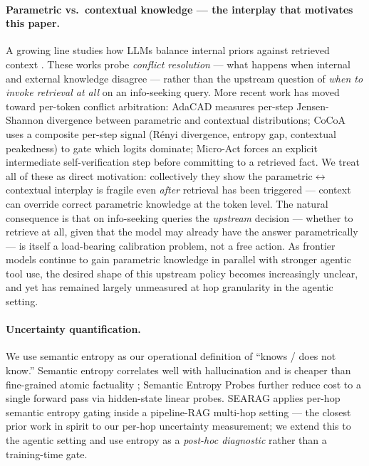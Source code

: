 \documentclass[10pt,letterpaper]{article}
\begin{document}
\paragraph{Parametric vs.\ contextual knowledge --- the interplay that motivates this paper.}
A growing line studies how LLMs balance internal priors against retrieved context
\citep{cheng2024interplay,wu2024clasheval,farahani2024deciphering,kim2025reliability,wadhwa2026rags,tao2024context,zhang2024fusion}.
These works probe \emph{conflict resolution} --- what happens when internal and external
knowledge disagree --- rather than the upstream question of \emph{when to invoke
retrieval at all} on an info-seeking query. More recent work has moved toward per-token
conflict arbitration: AdaCAD \citep{adacad2025} measures per-step Jensen-Shannon
divergence between parametric and contextual distributions; CoCoA \citep{cocoa2025} uses
a composite per-step signal (R\'{e}nyi divergence, entropy gap, contextual peakedness)
to gate which logits dominate; Micro-Act \citep{microact2025} forces an explicit
intermediate self-verification step before committing to a retrieved fact. We treat all
of these as direct motivation: collectively they show the parametric$\leftrightarrow$contextual
interplay is fragile even \emph{after} retrieval has been triggered --- context can
override correct parametric knowledge at the token level. The natural consequence is
that on info-seeking queries the \emph{upstream} decision --- whether to retrieve at
all, given that the model may already have the answer parametrically --- is itself a
load-bearing calibration problem, not a free action. As frontier models continue to
gain parametric knowledge in parallel with stronger agentic tool use, the desired
shape of this upstream policy becomes increasingly unclear, and yet has remained
largely unmeasured at hop granularity in the agentic setting.

\paragraph{Uncertainty quantification.}
We use semantic entropy \citep{farquhar2024,evidential2026} as our operational definition
of ``knows / does not know.'' Semantic entropy correlates well with
hallucination \citep{farquhar2024} and is cheaper than fine-grained atomic factuality
\citep{factscore2023}; Semantic Entropy Probes \citep{sep2024} further reduce cost to
a single forward pass via hidden-state linear probes. SEARAG \citep{searag2025} applies
per-hop semantic entropy gating inside a pipeline-RAG multi-hop setting --- the closest
prior work in spirit to our per-hop uncertainty measurement; we extend this to the
agentic setting and use entropy as a \emph{post-hoc diagnostic} rather than a
training-time gate.
\end{document}
